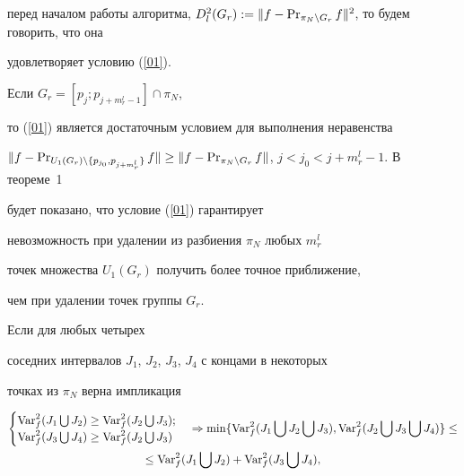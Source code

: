 перед началом работы алгоритма, $ D_l^2(G_r):=\|f-\PR_{\pi_N\setminus


G_r}f\|^2$, то будем говорить, что она


удовлетворяет условию (\ref{01}).





\begin{note}


Если $G_r=[p_j;p_{j+m_r^l-1}]\cap \pi_N$,


то (\ref {01}) является достаточным условием для выполнения неравенства


$\|f-\PR_{U_1(G_r)\setminus \{p_{j_0}, p_{j+m_r^l}\}}f\|\geq


\|f-\PR_{\pi_N\setminus G_r}f\|$, $j<j_0<j+m_r^l-1$. В теореме~1


будет показано, что условие (\ref {01}) гарантирует


невозможность при удалении из разбиения $\pi_N$ любых $m_r^l$


точек множества $U_1(G_r)$ получить более точное приближение,


чем при удалении точек группы $G_r$.


\end{note}





Если для любых четырех


соседних интервалов $J_1$, $J_2$, $J_3$, $J_4$ с концами в некоторых


точках из $\pi_N$ верна импликация


\begin{multline}


\begin{cases}


\Var_f^2(J_1\bigcup J_2)\geq \Var_f^2(J_2\bigcup J_3); \\


\Var_f^2(J_3\bigcup J_4)\geq \Var_f^2(J_2\bigcup J_3)


\end{cases}


\Rightarrow \min\{\Var_f^2(J_1\bigcup J_


2\bigcup J_3), \Var_f^2(J_2\bigcup J_3\bigcup


J_4)\}\leq \\ \le


\Var_f^2(J_1\bigcup J_2)+\Var_f^2(J_3\bigcup J_4),


\label{O2}


\end{multline}


